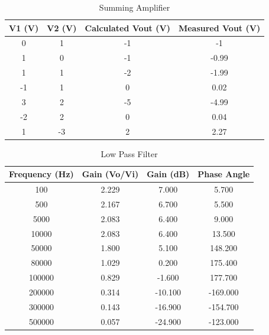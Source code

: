 \documentclass[CMPE]{KGCOEReport}
\begin{document}
\begin{table}[H]
    \centering
    \caption{Summing Amplifier}
    \begin{tabular}{|c|c|c|c|}
        \hline
        V1 (V) & V2 (V) & Calculated Vout (V) & Measured Vout (V) \\
        \hline
        0 & 1 & -1 & -1 \\
        1 & 0 & -1 & -0.99 \\
        1 & 1 & -2 & -1.99 \\
        -1 & 1 & 0 & 0.02 \\
        3 & 2 & -5 & -4.99 \\
        -2 & 2 & 0 & 0.04 \\
        1 & -3 & 2 & 2.27 \\
        \hline
    \end{tabular}
\end{table}


\begin{table}[H]
    \centering
    \caption{Low Pass Filter}
    \begin{tabular}{|c|c|c|c|}
        \hline
        Frequency (Hz) & Gain (Vo/Vi) & Gain (dB) & Phase Angle \\
        \hline
        100 & 2.229 & 7.000 & 5.700 \\
        500 & 2.167 & 6.700 & 5.500 \\
        5000 & 2.083 & 6.400 & 9.000 \\
        10000 & 2.083 & 6.400 & 13.500 \\
        50000 & 1.800 & 5.100 & 148.200 \\
        80000 & 1.029 & 0.200 & 175.400 \\
        100000 & 0.829 & -1.600 & 177.700 \\
        200000 & 0.314 & -10.100 & -169.000 \\
        300000 & 0.143 & -16.900 & -154.700 \\
        500000 & 0.057 & -24.900 & -123.000 \\
        \hline
    \end{tabular}
\end{table}
\end{document}
